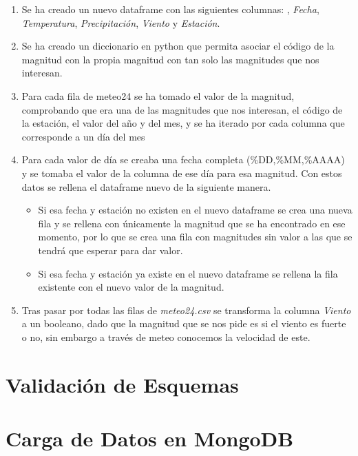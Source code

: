 \documentclass[]{article}
\begin{document}
\begin{enumerate}
    \item Se ha creado un nuevo dataframe con las siguientes columnas: , \textit{Fecha}, \textit{Temperatura}, \textit{Precipitación}, \textit{Viento} y \textit{Estación}.
    \item Se ha creado un diccionario en python que permita asociar el código de la magnitud con la propia magnitud con tan solo las magnitudes que nos interesan.
    \item Para cada fila de meteo24 se ha tomado el valor de la magnitud, comprobando que era una de las magnitudes que nos interesan, el código de la estación, el valor del año y del mes, y se ha iterado por cada columna que corresponde a un día del mes
    \item Para cada valor de día se creaba una fecha completa (\%DD,\%MM,\%AAAA) y se tomaba el valor de la columna de ese día para esa magnitud. Con estos datos se rellena el dataframe nuevo de la siguiente manera.
    \begin{itemize}
        \item Si esa fecha y estación no existen en el nuevo dataframe se crea una nueva fila y se rellena con únicamente la magnitud que se ha encontrado en ese momento, por lo que se crea una fila con magnitudes sin valor a las que se tendrá que esperar para dar valor.
        \item Si esa fecha y estación ya existe en el nuevo dataframe se rellena la fila existente con el nuevo valor de la magnitud.
    \end{itemize}
    \item Tras pasar por todas las filas de \textit{meteo24.csv} se transforma la columna \textit{Viento} a un booleano, dado que la magnitud que se nos pide es si el viento es fuerte o no, sin embargo a través de meteo conocemos la velocidad de este.
\end{enumerate}

\newpage
\section{Validación de Esquemas}
\label{sec:validacion}

\newpage
\section{Carga de Datos en MongoDB}
\label{sec:mondongo}
\end{document}
